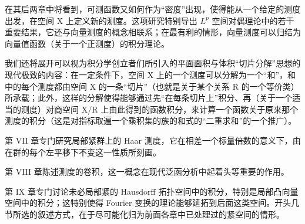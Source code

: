 在其后两章中将看到，可测函数又如何作为“密度”出现，使得能从一个给定的测度出发，在空间 X 上定义新的测度。这项研究特别导出 \(L^{p}\) 空间对偶理论中的若干重要结果，它还与向量测度的概念相联系；在最有利的情形，向量测度可以归结为向量值函数（关于一个正测度）的积分理论。

我们还将展开可以视为积分学创立者们所引入的平面面积与体积“切片分解”思想的现代极致的内容：在一定条件下，空间 X 上的一个测度可以分解为一个“和”，和中的每个测度都由空间 X 的一条“切片”（也就是关于某个关系 R 的一个等价类）所承载；此外，这样的分解使得能够通过先“在每条切片上”积分、再（关于一个适当的测度）对商空间 X/R 上由此得到的函数积分，来计算一个函数关于原来那个测度的积分（这是对指标取遍一个乘积集的族的和式的“二重求和”的一个推广）。

第 VII 章专门研究局部紧群上的 Haar 测度，它在相差一个标量倍数的意义下，由在群的每个左平移下不变这一性质所刻画。

第 VIII 章陈述测度的卷积，这一概念在现代泛函分析中起着头等重要的作用。

第 IX 章专门讨论未必局部紧的 Hausdorff 拓扑空间中的积分，特别是局部凸向量空间中的积分；这特别使得 Fourier 变换的理论能够延拓到后面这类空间。开头几节所选的叙述方式，在于尽可能化归为前面各章中已处理过的紧空间的情形。

